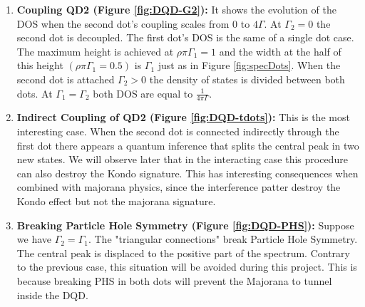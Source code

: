 \begin{enumerate}
    \item \textbf{Coupling QD2 (Figure \ref{fig:DQD-G2}):} It shows the evolution of the DOS when the second dot's coupling scales from $0$ to $4\Gamma$. At $\Gamma_2=0$  the second dot is decoupled. The first dot's DOS is the same of a single dot case. The maximum height is achieved at $\rho \pi \Gamma_1 =1$ and the width at the half of this height $(\rho \pi \Gamma_1 =0.5)$ is $\Gamma_1$ just as in Figure \ref{fig:specDots}. When the second dot is attached $\Gamma_2 >0$ the density of states is divided between both dots. At $\Gamma_1 = \Gamma_2$ both DOS are equal to $\frac{1}{4\pi\Gamma}$. 
    \item \textbf{Indirect Coupling of QD2 (Figure \ref{fig:DQD-tdots}):} This is the most interesting case. When the second dot is connected indirectly through the first dot there appears a quantum inference that splits the central peak in two new states. We will observe later that in the interacting case this procedure can also destroy the Kondo signature. This has interesting consequences when combined with majorana physics, since the interference patter destroy the Kondo effect but not the majorana signature. 
    \item \textbf{Breaking Particle Hole Symmetry (Figure \ref{fig:DQD-PHS}):}
    Suppose we have $\Gamma_2 = \Gamma_1$. The "triangular connections" break Particle Hole Symmetry. The central peak is displaced to the positive part of the spectrum. Contrary to the previous case, this situation will be avoided during this project. This is because breaking PHS in both dots will prevent the Majorana to tunnel inside the DQD. 
    
\end{enumerate}

